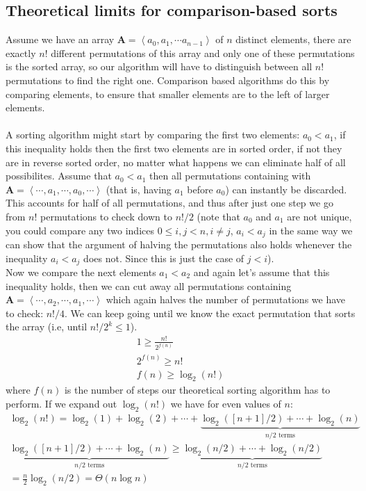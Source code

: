\subsection{Theoretical limits for comparison-based sorts}
Assume we have an array $\mathbf A=\left< a_0,a_1,\cdots a_{n-1}\right>$ of $n$ distinct elements, there are exactly $n!$ 
different permutations of this array
and only one of these permutations is the sorted array, so our algorithm will have to distinguish between all
$n!$ permutations to find the right one. Comparison based algorithms do this by comparing elements, to ensure
that smaller elements are to the left of larger elements.
\\\\
A sorting algorithm might start by comparing the first two elements: $a_0< a_1$, 
if this inequality holds then the first two elements are in sorted order, if not they are in reverse sorted
order, no matter what happens we can eliminate half of all possibilites. Assume that $a_0 < a_1$
then all permutations containing with $\mathbf A=\left< \cdots, a_1, \cdots, a_0,\cdots\right>$ (that is,
having $a_1$ before $a_0$) can instantly be discarded. This accounts for half of all permutations, and thus 
after just one step we go from $n!$ permutations to check down to $n!/2$ (note that $a_0$ and $a_1$ are
not unique, you could compare any two indices $0\leq i, j < n,i\neq j$, $a_i< a_j$ in the same way we can show
that the argument of halving the permutations also holds whenever the inequality $a_i< a_j$ does not. Since
this is just the case of $j< i$).
\\
Now we compare the next elements $a_1< a_2$ and again let's assume that this inequality holds, then we can
cut away all permutations containing $\mathbf A=\left< \cdots, a_2, \cdots, a_1,\cdots\right>$ which again
halves the number of permutations we have to check: $n!/4$. We can keep going until we know the exact 
permutation that sorts the array (i.e, until $n!/2^k\leq 1$).
\begin{equation}\label{f n geq n fac}
    \begin{split}
        1\geq \frac{n!}{2^{f(n)}}\\
        2^{f(n)}\geq n!\\
        f(n)\geq \log_2 (n!)
    \end{split}
\end{equation}
where $f(n)$ is the number of steps our theoretical sorting algorithm has to perform. If we expand out
$\log_2(n!)$ we have for even values of $n$:
\begin{equation}\label{log2 n factorial}
    \begin{split}
        \log_2(n!)=\log_2(1)+\log_2(2)+\cdots+\underbrace{\log_2([n+1]/2)+\cdots+\log_2(n)}_{n/2\text{ terms}}\\
        \underbrace{\log_2([n+1]/2)+\cdots+\log_2(n)}_{n/2\text{ terms}}\geq 
        \underbrace{\log_2(n/2)+\cdots+\log_2(n/2)}_{n/2\text{ terms}}\\
        =\frac{n}{2}\log_2{(n/2)}=\Theta(n\log n)
    \end{split}
\end{equation}
